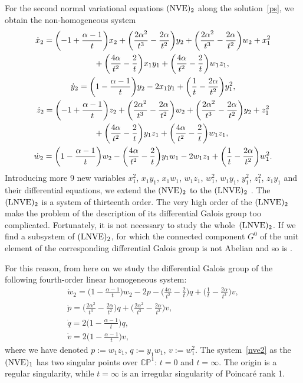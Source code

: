 \documentclass[pdftex]{sigma}
\numberwithin{equation}{section}
\begin{document}
 For the second normal variational equations $({\rm NVE})_2$ along the solution~\eqref{ps}, we obtain the
 non-homogeneous system
 \begin{gather*}
 \dot{x}_2 =
 \biggl(-1 + \frac{\alpha-1}{t}\biggr) x_2 + \biggl(\frac{2 \alpha^2}{t^3} - \frac{2 \alpha}{t^2}\biggr) y_2
 + \biggl(\frac{2 \alpha^2}{t^3} - \frac{2 \alpha}{t^2}\biggr) w_2
 + x_1^2 \\
 \hphantom{\dot{x}_2 =}{} +\biggl(\frac{4 \alpha}{t^2} - \frac{2}{t}\biggr) x_1 y_1 +
 \biggl(\frac{4 \alpha}{t^2} - \frac{2}{t}\biggr) w_1 z_1,\\
 \dot{y}_2 =
 \biggl(1 - \frac{ \alpha -1}{t} \biggr) y_2 -2 x_1 y_1 + \biggl(\frac{1}{t} - \frac{2 \alpha}{t^2}\biggr) y_1^2,\\
 \dot{z}_2 =
 \biggl(-1 + \frac{\alpha-1}{t} \biggr) z_2 +
 \biggl(\frac{2 \alpha^2}{t^3} - \frac{2 \alpha}{t^2}\biggr) w_2
 + \biggl(\frac{2 \alpha^2}{t^3} - \frac{2 \alpha}{t^2}\biggr) y_2 + z^2_1\\
 \hphantom{\dot{z}_2 =}{} + \biggl(\frac{4 \alpha}{t^2} - \frac{2}{t}\biggr) y_1 z_1 +
 \biggl(\frac{4 \alpha}{t^2} -\frac{2}{t}\biggr) w_1 z_1,\\
 \dot{w}_2 =
 \biggl(1 - \frac{\alpha-1}{t}\biggr) w_2 -
 \biggl(\frac{4 \alpha}{t^2} - \frac{2}{t}\biggr) y_1 w_1 - 2 w_1 z_1
 +\biggl(\frac{1}{t} - \frac{2 \alpha}{t^2}\biggr) w_1^2 .
 \end{gather*}
 Introducing more 9 new variables
 $x_1^2$, $x_1 y_1$, $x_1 w_1$, $w_1 z_1$, $w_1^2$, $w_1 y_1$, $y_1^2$, $z_1^2$, $z_1 y_1$ and their differential equations, we extend the $({\rm NVE})_2$ to the $({\rm LNVE})_2$ \cite{MRS}.
 The $({\rm LNVE})_2$ is a system of thirteenth order.
 The very high order of the $({\rm LNVE})_2$ make the problem of the description of its differential Galois group
 too complicated. Fortunately, it is not necessary to study the whole~$({\rm LNVE})_2$. If we find a subsystem
 of $({\rm LNVE})_2$, for which the connected component $G^0$ of the unit element of the corresponding
 differential Galois group is not Abelian and so is .

 For this reason, from here on we study the differential Galois group of the following fourth-order linear homogeneous system:
 \begin{gather}
 \dot{w}_2 =
 \biggl(1 - \frac{\alpha-1}{t}\biggr) w_2 - 2 p -
 \biggl(\frac{4 \alpha}{t^2} - \frac{2}{t}\biggr) q
 +\biggl(\frac{1}{t} - \frac{2 \alpha}{t^2}\biggr) v,\nonumber\\
 \dot{p} =
 \biggl(\frac{2 \alpha^2}{t^3} - \frac{2 \alpha}{t^2}\biggr) q
 + \biggl(\frac{2 \alpha^2}{t^3} - \frac{2 \alpha}{t^2}\biggr) v,\nonumber\\
 \dot{q} =
 2 \biggl(1- \frac{\alpha-1}{t}\biggr) q,\nonumber\\
 \dot{v} =
 2 \biggl(1- \frac{\alpha-1}{t}\biggr) v ,\label{nve2}
 \end{gather}
 where we have denoted $p:=w_1 z_1$, $q:=y_1 w_1$, $v:=w^2_1$. The system~\eqref{nve2} as the $({\rm NVE})_1$ has two singular
 points over $\mathbb{C}\mathbb{P}^1$: $t=0$ and $t=\infty$. The origin is a regular singularity, while $t=\infty$ is an irregular
 singularity of Poincar\'{e} rank 1.
\end{document}
